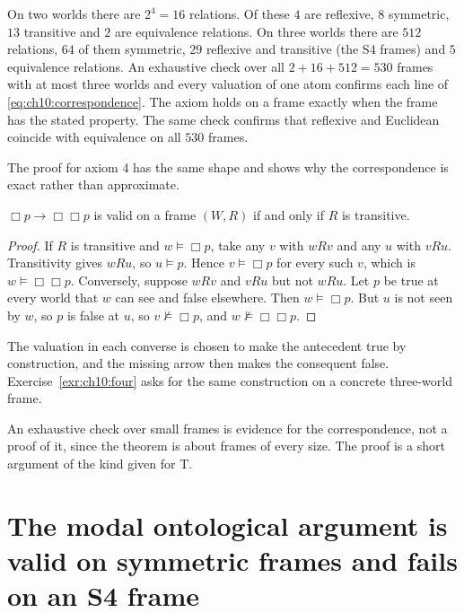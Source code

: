 \begin{example}\label{ex:ch10:count}
On two worlds there are $2^4=16$ relations. Of these $4$ are reflexive, $8$ symmetric, $13$ transitive and $2$ are equivalence relations. On three worlds there are $512$ relations, $64$ of them symmetric, $29$ reflexive and transitive (the S4 frames) and $5$ equivalence relations. An exhaustive check over all $2+16+512=530$ frames with at most three worlds and every valuation of one atom confirms each line of \eqref{eq:ch10:correspondence}. The axiom holds on a frame exactly when the frame has the stated property. The same check confirms that reflexive and Euclidean coincide with equivalence on all $530$ frames.
\end{example}

The proof for axiom 4 has the same shape and shows why the correspondence is exact rather than approximate.
\begin{theorem}\label{thm:ch10:four}
$\Box p\to\Box\Box p$ is valid on a frame $(W,R)$ if and only if $R$ is transitive.
\end{theorem}
\begin{proof}
If $R$ is transitive and $w\models\Box p$, take any $v$ with $wRv$ and any $u$ with $vRu$. Transitivity gives $wRu$, so $u\models p$. Hence $v\models\Box p$ for every such $v$, which is $w\models\Box\Box p$. Conversely, suppose $wRv$ and $vRu$ but not $wRu$. Let $p$ be true at every world that $w$ can see and false elsewhere. Then $w\models\Box p$. But $u$ is not seen by $w$, so $p$ is false at $u$, so $v\not\models\Box p$, and $w\not\models\Box\Box p$.
\end{proof}
The valuation in each converse is chosen to make the antecedent true by construction, and the missing arrow then makes the consequent false. Exercise~\ref{exr:ch10:four} asks for the same construction on a concrete three-world frame.

An exhaustive check over small frames is evidence for the correspondence, not a proof of it, since the theorem is about frames of every size. The proof is a short argument of the kind given for T.


\section{The modal ontological argument is valid on symmetric frames and fails on an S4 frame}\label{sec:ch10:ontological}

